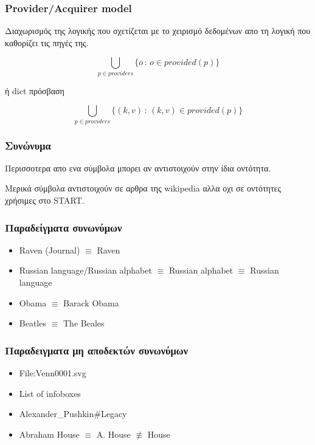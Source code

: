 \documentclass[bigger]{beamer}
\begin{document}
\begin{frame}
  \frametitle{Provider/Acquirer model}

  Διαχωρισμός της λογικής που σχετίζεται με το χειρισμό δεδομένων απο
  τη λογική που καθορίζει τις πηγές της.

  \vfill

  \[
    \bigcup_{p \in providers} \{ o \, : \, o \in provided(p) \}
  \]

  ή dict πρόσβαση

  \[
    \bigcup_{p \in providers} \{ (k, v)\, : \, (k, v) \in provided(p) \}
  \]

  \vfill

\end{frame}

\begin{frame}
  \frametitle{Συνώνυμα}

  Περισσοτερα απο ενα σύμβολα μπορει αν αντιστοιχούν στην ίδια
  οντότητα.

  \hfill

  Μερικά σύμβολα αντιστοιχούν σε αρθρα της wikipedia αλλα οχι σε
  οντότητες χρήσιμες στο START.

\end{frame}

\begin{frame}
  \frametitle{Παραδείγματα συνωνύμων}

  \begin{itemize}
  \item Raven (Journal) \(\equiv\) Raven
  \item Russian language/Russian alphabet \(\equiv\) Russian alphabet
    \(\equiv\) Russian language
  \item Obama \(\equiv\) Barack Obama
  \item Beatles \(\equiv\) The Beales
  \end{itemize}

\end{frame}

\begin{frame}
  \frametitle{Παραδειγματα μη αποδεκτών συνωνύμων}
  \begin{itemize}
  \item File:Venn0001.svg
  \item List of infoboxes
  \item Alexander\_Pushkin\#Legacy
  \item Abraham House \(\equiv\) A. House \(\not\equiv\) House
  \end{itemize}
\end{frame}
\end{document}
